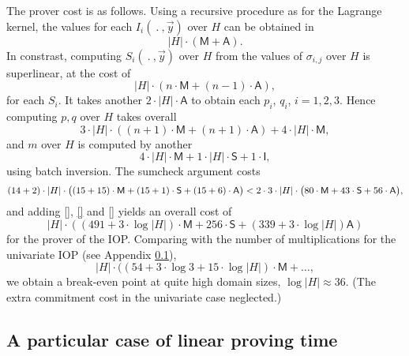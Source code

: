 \documentclass[11pt]{article}
\theoremstyle{definition}
\theoremstyle{remark}
\begin{document}
The prover cost is as follows.
Using a recursive procedure as for the Lagrange kernel, the values for each $I_i(\:.\:, \vec y)$ over $H$ can be obtained in  
\[
|H|\cdot(\mathsf M + \mathsf A).
\]
In constrast,  computing $S_i(\:.\:, \vec y)$ over $H$ from the values of $\sigma_{i,j}$ over $H$ is superlinear, at the cost of
\[
|H|\cdot (n\cdot\mathsf M + (n-1)\cdot \mathsf A),
\]
for each $S_i$. 
It takes another $2\cdot |H|\cdot \mathsf A$ to obtain each $p_i$, $q_i$, $i=1,2,3$.
Hence computing $p, q$ over $H$ takes overall
\begin{equation}
3\cdot |H|\cdot ( (n + 1)\cdot\mathsf M + (n+1)\cdot\mathsf A) + 4\cdot |H|\cdot \mathsf M,
\end{equation}
and $m$ over $H$ is computed by another 
\begin{equation}
4\cdot |H| \cdot\mathsf M + 1\cdot |H|\cdot \mathsf S + 1\cdot\mathsf I,
\end{equation}
using batch inversion.
The sumcheck argument costs
\begin{equation}
(14 + 2) \cdot |H| \cdot \big((15 + 15) \cdot\textsf M +  (15 + 1) \cdot\textsf S + (15 + 6) \cdot \textsf A\big) 
< 2\cdot 3\cdot |H| \cdot \big(80 \cdot\textsf M +  43\cdot\textsf S + 56 \cdot \textsf A\big),
\end{equation}
and adding \eqref{}, \eqref{} and \eqref{} yields an overall cost of 
\begin{equation}
|H|\cdot ((491  + 3\cdot \log|H|)\cdot\mathsf M + 256\cdot \mathsf S + (339 + 3\cdot\log|H|)\mathsf A)
\end{equation}
for the prover of the IOP.
Comparing with the number of multiplications for the univariate IOP (see Appendix \ref{}), 
\begin{equation}
|H| \cdot ((54 + 3\cdot\log 3 + 15\cdot \log|H|)\cdot\mathsf M + \ldots,
\end{equation}
we obtain a break-even point at quite high domain sizes, $\log |H| \approx 36$.
(The extra commitment cost in the univariate case neglected.)

\subsection{A particular case of linear proving time}
\end{document}
